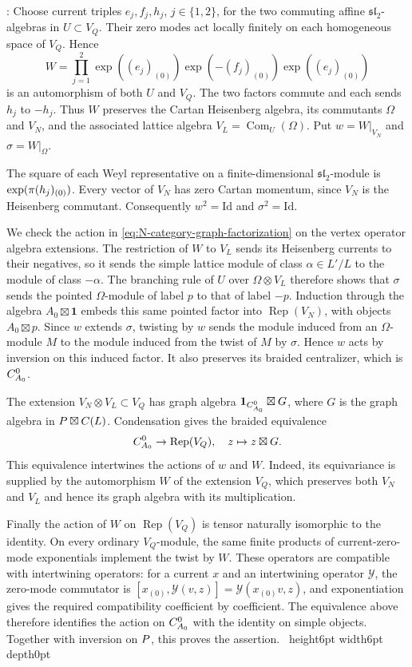 \documentclass[leqno]{article}
\let\cal\relax
\newcommand{\cal}{\mathcal}
\newcommand{\Id}{\mathrm{Id}}
\newcommand{\qed}{\hfill \vrule height6pt  width6pt depth0pt}
\newcommand{\ot}{\otimes}
\let\i\relax
\newcommand{\i}{\mathrm{i}}
\DeclareMathOperator{\Rep}{Rep}
\newenvironment{proof}[1][]{\noindent {\it Proof #1} : }{\hbox{~}\qed
\smallskip
}
\numberwithin{equation}{section}
\begin{document}
\begin{proof}
Choose current triples $e_j,f_j,h_j$, $j \in \{1,2\}$, for the two commuting affine $\mathfrak{sl}_2$-algebras in $U \subset V_Q$. Their zero modes act locally finitely on each homogeneous space of $V_Q$. Hence
\[
W = \prod_{j=1}^2
\exp((e_j)_{(0)})\exp(-(f_j)_{(0)})\exp((e_j)_{(0)})
\]
is an automorphism of both $U$ and $V_Q$. The two factors commute and each sends $h_j$ to $-h_j$. Thus $W$ preserves the Cartan Heisenberg algebra, its commutants $\Omega$ and $V_N$, and the associated lattice algebra $V_L = \operatorname{Com}_U(\Omega)$. Put $w = W|_{V_N}$ and $\sigma = W|_\Omega$.

The square of each Weyl representative on a finite-dimensional $\mathfrak{sl}_2$-module is $\exp(\pi\i(h_j)_{(0)})$. Every vector of $V_N$ has zero Cartan momentum, since $V_N$ is the Heisenberg commutant. Consequently $w^2 = \Id$ and $\sigma^2 = \Id$.

We check the action in \eqref{eq:N-category-graph-factorization} on the vertex operator algebra extensions. The restriction of $W$ to $V_L$ sends its Heisenberg currents to their negatives, so it sends the simple lattice module of class $\alpha \in L'/L$ to the module of class $-\alpha$. The branching rule of $U$ over $\Omega\ot V_L$ therefore shows that $\sigma$ sends the pointed $\Omega$-module of label $p$ to that of label $-p$. Induction through the algebra $A_0\boxtimes\mathbf1$ embeds this same pointed factor into $\Rep(V_N)$, with objects $A_0\boxtimes p$. Since $w$ extends $\sigma$, twisting by $w$ sends the module induced from an $\Omega$-module $M$ to the module induced from the twist of $M$ by $\sigma$. Hence $w$ acts by inversion on this induced factor. It also preserves its braided centralizer, which is $\cal C_{A_0}^0$.

The extension $V_N\ot V_L \subset V_Q$ has graph algebra $\mathbf1_{\cal C_{A_0}^0}\boxtimes G$, where $G$ is the graph algebra in $\cal P\boxtimes\cal C(L)$. Condensation gives the braided equivalence
\[
\cal C_{A_0}^0 \to \Rep(V_Q),\quad z \mapsto z\boxtimes G.
\]
This equivalence intertwines the actions of $w$ and $W$. Indeed, its equivariance is supplied by the automorphism $W$ of the extension $V_Q$, which preserves both $V_N$ and $V_L$ and hence its graph algebra with its multiplication.

Finally the action of $W$ on $\Rep(V_Q)$ is tensor naturally isomorphic to the identity. On every ordinary $V_Q$-module, the same finite products of current-zero-mode exponentials implement the twist by $W$. These operators are compatible with intertwining operators: for a current $x$ and an intertwining operator $\mathcal Y$, the zero-mode commutator is $[x_{(0)},\mathcal Y(v,z)] = \mathcal Y(x_{(0)}v,z)$, and exponentiation gives the required compatibility coefficient by coefficient. The equivalence above therefore identifies the action on $\cal C_{A_0}^0$ with the identity on simple objects. Together with inversion on $\cal P$, this proves the assertion.
\end{proof}
\end{document}
